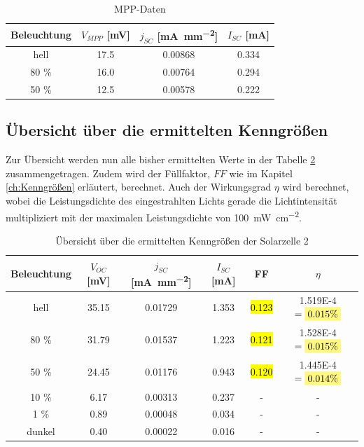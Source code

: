 \documentclass[12pt,a4paper,ngerman]{report}
\newcommand{\highlight}[1]{%
	\colorbox{yellow!50}{$\displaystyle#1$}} %
\begin{document}
\begin{table}[h!]
	\centering
	\begin{tabular}{c c c c}
		\toprule[1.5pt]
		Beleuchtung & $V_{MPP}$ [\si{\milli \volt}] & $j_{SC}$ [\si{\milli \ampere \per \milli \meter \squared}] & $I_{SC}$ [\si{\milli \ampere}] \\
		\midrule
		hell        & 17.5  &  0.00868  & 0.334      \\
		80 \%       & 16.0  &  0.00764  & 0.294       \\
		50 \%       & 12.5  &  0.00578  & 0.222        \\
		\bottomrule[1.5pt]
	\end{tabular}
	\caption{MPP-Daten}\label{table:MPP}
\end{table}

\subsection{Übersicht über die ermittelten Kenngrößen}
Zur Übersicht werden nun alle bisher ermittelten Werte in der Tabelle \ref{table:übersicht} zusammengetragen. Zudem wird der Füllfaktor, $FF$ wie im Kapitel \ref{ch:Kenngrößen} erläutert, berechnet. Auch der Wirkungsgrad $\eta$ wird berechnet, wobei die Leistungsdichte des eingestrahlten Lichts gerade die Lichtintensität multipliziert mit der maximalen Leistungsdichte von \SI{100}{ \milli \watt \per \centi \meter \squared}.
\begin{table}[h!]
	\centering
	\begin{tabular}{c c c c c c }
		\toprule[1.5pt]
		Beleuchtung & $V_{OC}$ [\si{\milli \volt}] & $j_{SC}$ [\si{\milli \ampere \per \milli \meter \squared}] & $I_{SC}$ [\si{\milli \ampere}] & FF & $\eta$\\
		\midrule
		hell        & 35.15  &  0.01729  & 1.353 & \hl{0.123} & 1.519E-4 $= \highlight{0.015 \%}$  \\
		80 \%       & 31.79  &  0.01537  & 1.223 & \hl{0.121} & 1.528E-4 $= \highlight{0.015 \%}$  \\
		50 \%       & 24.45  &  0.01176  & 0.943 & \hl{0.120} & 1.445E-4 $= \highlight{0.014 \%}$  \\
		10 \%       & 6.17   &  0.00313  & 0.237 &   -   & -   \\
		1  \%       & 0.89   &  0.00048  & 0.034 &   -   & -\\
		dunkel      & 0.40   &  0.00022  & 0.016 &   -   & - \\
		\bottomrule[1.5pt]
	\end{tabular}
	\caption{Übersicht über die ermittelten Kenngrößen der Solarzelle 2}\label{table:übersicht}
\end{table}
\end{document}
